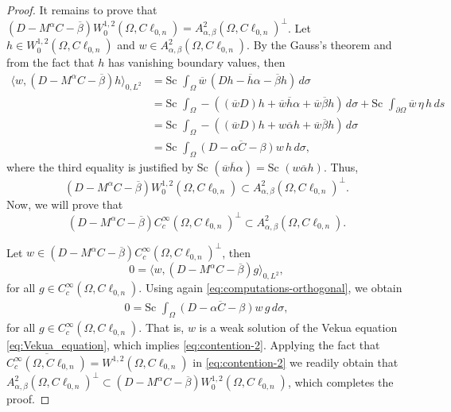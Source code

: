 \documentclass[10pt,a4paper]{amsart}
\begin{document}
\begin{proof}
It remains to prove that $(D-M^{\alpha}C-\overline{\beta}) W_0^{1,2}(\Omega,C\ell_{0,n})=A_{\alpha,\beta}^2(\Omega,C\ell_{0,n})^{\bot}$.
Let $h\in W_0^{1,2}(\Omega,C\ell_{0,n})$ and $w\in A_{\alpha,\beta}^2(\Omega,C\ell_{0,n})$. By the Gauss's theorem and from the fact that $h$ has vanishing boundary values, then
\begin{align}\label{eq:computations-orthogonal}
  \nonumber \langle w, (D-M^{\alpha}C-\overline{\beta})h \rangle_{0,L^2}&=\text{Sc }\int_{\Omega} \overline{w} \, (Dh-\overline{h}\alpha-\overline{\beta}h)\, d\sigma\\
  \nonumber &=\text{Sc }\int_{\Omega} -((\overline{w}D)h+\overline{w}\overline{h}\alpha+\overline{w}\overline{\beta}h)\, d\sigma+\text{Sc }\int_{\partial\Omega} \overline{w} \,\eta\,  h\, ds\\
    \nonumber &=\text{Sc }\int_{\Omega} -((\overline{w}D)h+w\overline{\alpha}h+\overline{w}\overline{\beta}h)\, d\sigma\\
    &=\text{Sc }\int_{\Omega} \overline{(D-\alpha C-\beta)w} \, h\, d\sigma,
\end{align}
where the third equality is justified by $\text{Sc }(\overline{w}\overline{h}\alpha)=\text{Sc }(w\overline{\alpha}h)$. Thus, 
\begin{equation*}%
(D-M^{\alpha}C-\overline{\beta}) W_0^{1,2}(\Omega,C\ell_{0,n})\subset A_{\alpha,\beta}^2(\Omega,C\ell_{0,n})^{\bot}.
\end{equation*}
Now, we will prove that 
\begin{equation}\label{eq:contention-2}
(D-M^{\alpha}C-\overline{\beta})C_{c}^{\infty}(\Omega,C\ell_{0,n})^{\bot}\subset A_{\alpha,\beta}^2(\Omega,C\ell_{0,n}).
\end{equation}

Let $w \in (D-M^{\alpha}C-\overline{\beta})C_{c}^{\infty}(\Omega,C\ell_{0,n})^{\bot}$, then
\[
0=\nonumber \langle w, (D-M^{\alpha}C-\overline{\beta})g \rangle_{0,L^2},
\]
for all $g\in C_{c}^{\infty}(\Omega,C\ell_{0,n})$. Using again \eqref{eq:computations-orthogonal}, we obtain
\begin{align*}%
0=\text{Sc }\int_{\Omega} \overline{(D-\alpha C-\beta)w} \, g\, d\sigma,
\end{align*}
for all $g\in C_{c}^{\infty}(\Omega,C\ell_{0,n})$. That is, $w$ is a weak solution of the Vekua equation \eqref{eq:Vekua_equation}, which implies \eqref{eq:contention-2}. Applying the fact that $\overline{C_{c}^{\infty}(\Omega,C\ell_{0,n})}=W^{1,2}(\Omega,C\ell_{0,n})$ in \eqref{eq:contention-2} we readily obtain that $A_{\alpha,\beta}^2(\Omega,C\ell_{0,n})^{\bot}\subset (D-M^{\alpha}C-\overline{\beta}) W_0^{1,2}(\Omega,C\ell_{0,n})$, which completes the proof.
\end{proof}
\end{document}
